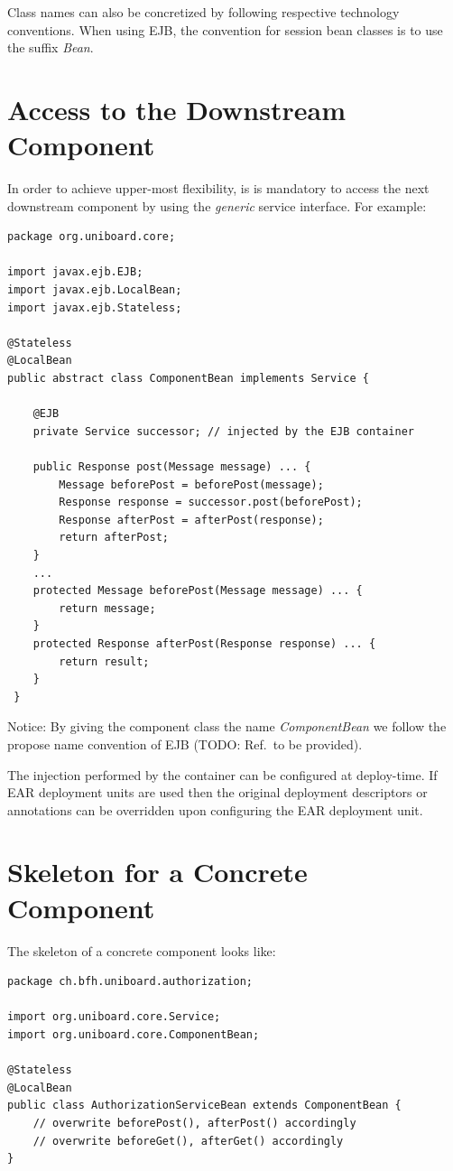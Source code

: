 \documentclass[oneside]{scrreprt}
\begin{document}
Class names can also be concretized by following respective
technology conventions. When using EJB, the convention for
session bean classes is to use the suffix \emph{Bean}.


\section{Access to the Downstream Component}

In order to achieve upper-most flexibility, is is mandatory to
access the next downstream component by using the \emph{generic}
service interface. For example:

\begin{lstlisting}
package org.uniboard.core;

import javax.ejb.EJB;
import javax.ejb.LocalBean;
import javax.ejb.Stateless;

@Stateless
@LocalBean
public abstract class ComponentBean implements Service {

    @EJB
    private Service successor; // injected by the EJB container

    public Response post(Message message) ... {
        Message beforePost = beforePost(message);
        Response response = successor.post(beforePost);
        Response afterPost = afterPost(response);
        return afterPost;
    }
    ...
    protected Message beforePost(Message message) ... {
        return message;
    }
    protected Response afterPost(Response response) ... {
        return result;
    }
 }
\end{lstlisting}

Notice: By giving the component class the name \emph{ComponentBean}
we follow the propose name convention of EJB (TODO: Ref.\ to be
provided).

The injection performed by the container can be configured at
deploy-time. If EAR deployment units are used then the original
deployment descriptors or annotations can be overridden upon
configuring the EAR deployment unit.


\section{Skeleton for a Concrete Component}

The skeleton of a concrete component looks like:

\begin{lstlisting}
package ch.bfh.uniboard.authorization;

import org.uniboard.core.Service;
import org.uniboard.core.ComponentBean;

@Stateless
@LocalBean
public class AuthorizationServiceBean extends ComponentBean {
    // overwrite beforePost(), afterPost() accordingly
    // overwrite beforeGet(), afterGet() accordingly
}
\end{lstlisting}
\end{document}
